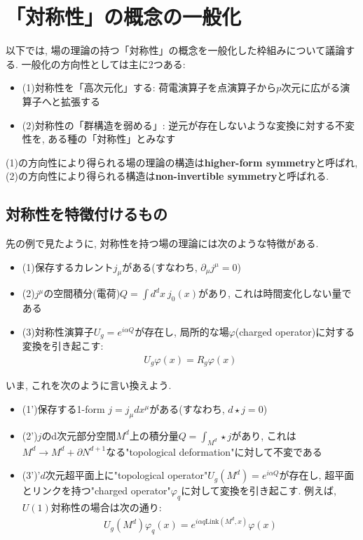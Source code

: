 \documentclass{ltjsarticle}
\theoremstyle{mystyle} %
\numberwithin{equation}{section}
\begin{document}
\section{「対称性」の概念の一般化}
以下では, 場の理論の持つ「対称性」の概念を一般化した枠組みについて議論する. 
一般化の方向性としては主に2つある: 
\begin{itemize}
    \item (1)対称性を「高次元化」する: 荷電演算子を点演算子から$p$次元に広がる演算子へと拡張する
    \item (2)対称性の「群構造を弱める」: 逆元が存在しないような変換に対する不変性を, ある種の「対称性」とみなす
\end{itemize}
(1)の方向性により得られる場の理論の構造は\textbf{higher-form symmetry}と呼ばれ, 
(2)の方向性により得られる構造は\textbf{non-invertible symmetry}と呼ばれる. 
\subsection{対称性を特徴付けるもの}
先の例で見たように, 対称性を持つ場の理論には次のような特徴がある. 
\begin{itemize}
    \item (1)保存するカレント$j_\mu$がある(すなわち, $\partial_\mu j^{\mu}=0$)
    \item (2)$j^\mu$の空間積分(電荷)$Q=\int d^{d}x~j_{0}(x)$があり, これは時間変化しない量である
    \item (3)対称性演算子$U_g=e^{i\alpha Q}$が存在し, 局所的な場$\varphi$(charged operator)に対する変換を引き起こす: 
    \begin{align}
        U_g \varphi(x) = R_g\varphi(x)
    \end{align}
\end{itemize}
いま, これを次のように言い換えよう. 
\begin{itemize}
    \item (1')保存する1-form $j=j_{\mu}dx^{\mu}$がある(すなわち, $d\star j=0$)
    \item (2')$j$のd次元部分空間$M^{d}$上の積分量$Q=\int_{M^d}\star j$があり, これは$M^d\to M^d + \partial N^{d+1}$なる"topological deformation"に対して不変である
    \item (3')'$d$次元超平面上に"topological operator"$U_g(M^d)=e^{i\alpha Q}$が存在し, 超平面とリンクを持つ"charged operator"$\varphi_q$に対して変換を引き起こす. 例えば, $U(1)$対称性の場合は次の通り: 
    \begin{align}
        U_g(M^d) \varphi_q(x) = e^{i\alpha q \mathrm{Link}(M^d, x)}\varphi(x)
    \end{align}
\end{itemize}
\end{document}
